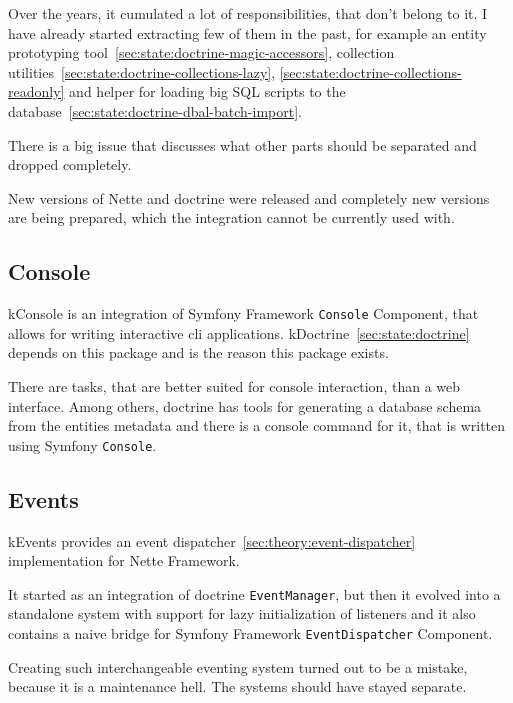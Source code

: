 Over the years, it cumulated a lot of responsibilities, that don't belong to it. I have already started extracting few of them in the past, for example an entity prototyping tool~\ref{sec:state:doctrine-magic-accessors}, collection utilities~\ref{sec:state:doctrine-collections-lazy}, \ref{sec:state:doctrine-collections-readonly} and helper for loading big SQL scripts to the database~\ref{sec:state:doctrine-dbal-batch-import}.

There is a big issue  that discusses what other parts should be separated and dropped completely.

New versions of Nette and \gls{doctrine} were released and completely new versions are being prepared, which the integration cannot be currently used with.

\tocless\subsection{Console} \label{sec:state:console}

\gls{kConsole} is an integration of Symfony Framework \lstinline{Console} Component, that allows for writing interactive cli applications. \gls{kDoctrine}~\ref{sec:state:doctrine} depends on this package and is the reason this package exists.

There are tasks, that are better suited for console interaction, than a web interface. Among others, \gls{doctrine} has tools for generating a database schema from the entities metadata and there is a console command for it, that is written using Symfony \lstinline{Console}.

\tocless\subsection{Events} \label{sec:state:events}

\gls{kEvents} provides an event dispatcher~\ref{sec:theory:event-dispatcher} implementation for Nette Framework.

It started as an integration of \gls{doctrine} \lstinline{EventManager}, but then it evolved into a standalone system with support for lazy initialization of listeners and it also contains a naive bridge for Symfony Framework \lstinline{EventDispatcher} Component.

Creating such interchangeable eventing system turned out to be a mistake, because it is a maintenance hell. The systems should have stayed separate.

